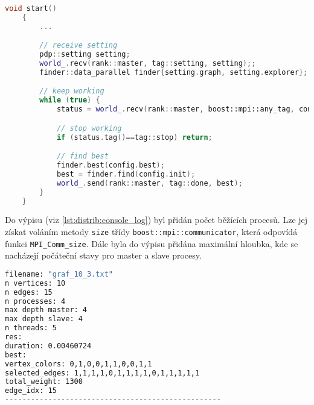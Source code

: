 \begin{lstlisting}[language=C++, label={lst:distrib:start}, caption={Hlavní metoda třídy slave procesu}]
    void start()
    {
        ...

        // receive setting
        pdp::setting setting;
        world_.recv(rank::master, tag::setting, setting);;
        finder::data_parallel finder{setting.graph, setting.explorer};

        // keep working
        while (true) {
            status = world_.recv(rank::master, boost::mpi::any_tag, config);

            // stop working
            if (status.tag()==tag::stop) return;

            // find best
            finder.best(config.best);
            best = finder.find(config.init);
            world_.send(rank::master, tag::done, best);
        }
    }
\end{lstlisting}

Do výpisu (viz \ref{lst:distrib:console_log}) byl přidán počet běžících procesů.
Lze jej získat voláním metody \texttt{size} třídy \linebreak \texttt{boost::mpi::communicator}, která odpovídá funkci \texttt{MPI\_Comm\_size}.
Dále byla do výpisu přidána maximální hloubka, kde se nacházejí počáteční stavy pro master a slave procesy.

\begin{lstlisting}[language=bash, label={lst:distrib:console_log}, caption={Příklad výpisu výsledků}]
filename: "graf_10_3.txt"
n vertices: 10
n edges: 15
n processes: 4
max depth master: 4
max depth slave: 4
n threads: 5
res:
duration: 0.00460724
best:
vertex_colors: 0,1,0,0,1,1,0,0,1,1
selected_edges: 1,1,1,1,0,1,1,1,1,0,1,1,1,1,1
total_weight: 1300
edge_idx: 15
--------------------------------------------------
\end{lstlisting}






